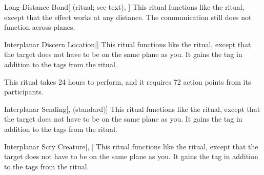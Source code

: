 \lowercase{\hypertarget{spell:Long-Distance Bond}{}}\label{spell:Long-Distance Bond}
\begin{attuneability}[Rank 6]{\hypertarget{spell:Long-Distance Bond}{Long-Distance Bond}}[ (ritual; see text), ]
This ritual functions like the  ritual, except that the effect works at any distance.
The communication still does not function across planes.
\end{attuneability}
\vspace{0.25em}



\lowercase{\hypertarget{spell:Interplanar Discern Location}{}}\label{spell:Interplanar Discern Location}
\begin{apability}[Rank 7]{\hypertarget{spell:Interplanar Discern Location}{Interplanar Discern Location}}[]
This ritual functions like the  ritual, except that the target does not have to be on the same plane as you.
It gains the  tag in addition to the tags from the  ritual.

This ritual takes 24 hours to perform, and it requires 72 action points from its participants.
\end{apability}
\vspace{0.25em}



\lowercase{\hypertarget{spell:Interplanar Sending}{}}\label{spell:Interplanar Sending}
\begin{apability}[Rank 7]{\hypertarget{spell:Interplanar Sending}{Interplanar Sending}}[,  (standard)]
This ritual functions like the  ritual, except that the target does not have to be on the same plane as you.
It gains the  tag in addition to the tags from the  ritual.
\end{apability}
\vspace{0.25em}



\lowercase{\hypertarget{spell:Interplanar Scry Creature}{}}\label{spell:Interplanar Scry Creature}
\begin{apability}[Rank 8]{\hypertarget{spell:Interplanar Scry Creature}{Interplanar Scry Creature}}[, ]
This ritual functions like the  ritual, except that the target does not have to be on the same plane as you.
It gains the  tag in addition to the tags from the  ritual.
\end{apability}
\vspace{0.25em}



